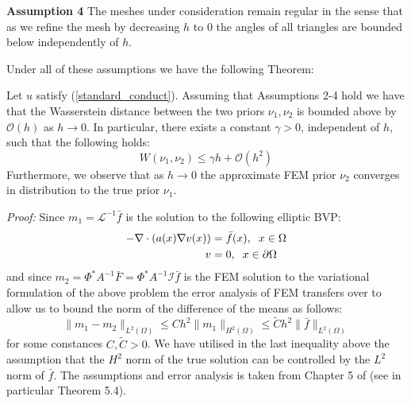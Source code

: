 \noindent \textbf{Assumption 4 } The meshes under consideration remain regular in the sense that as we refine the mesh by decreasing $h$ to 0 the angles of all triangles are bounded below independently of $h$.

Under all of these assumptions we have the following Theorem:
\vspace{10pt}

\begin{theorem}
    \label{prior_distance_bound}
    Let $u$ satisfy (\ref{standard_conduct}). Assuming that Assumptions 2-4 hold we have that the Wasserstein distance between the two priors $\nu_1,\nu_2$ is bounded above by $\mathcal{O}(h)$ as $h\rightarrow 0$. In particular, there exists a constant $\gamma>0$, independent of $h$, such that the following holds:
    \begin{equation}
        \label{bound_on_distance}
        W(\nu_{1},\nu_{2})\leq \gamma h +\mathcal{O}(h^2)
    \end{equation}
    Furthermore, we observe that as $h\rightarrow 0$ the approximate FEM prior $\nu_2$ converges in distribution to the true prior $\nu_1$.
\end{theorem}

\noindent \textit{Proof:} Since $m_1=\mathcal{L}^{-1}\bar{f}$ is the solution to the following elliptic BVP:
\begin{align*}
    -\nabla\cdot(a(x)\nabla v(x)) &= \bar{f}(x), \hspace{0.2cm} x\in\Omega \\
    v &= 0, \hspace{0.2cm} x\in\partial\Omega
\end{align*}
and since $m_2=\Phi^{*}A^{-1}\bar{F}=\Phi^{*}A^{-1}\mathcal{I}\bar{f}$ is the FEM solution to the variational formulation of the above problem the error analysis of FEM transfers over to allow us to bound the norm of the difference of the means as follows:
\begin{equation}
    \label{bound_on_diff_means}
    \|m_1-m_2\|_{L^{2}(\Omega)}\leq Ch^{2}\|m_{1}\|_{H^{2}(\Omega)}\leq\tilde{C}h^{2}\|\bar{f}\|_{L^{2}(\Omega)}
\end{equation}
for some constances $C,\tilde{C}>0$. We have utilised in the last inequality above the assumption that the $H^2$ norm of the true solution can be controlled by the $L^2$ norm of $\bar{f}$. The assumptions and error analysis is taken from Chapter 5 of \textcolor{blue}{\cite{larsson2008partial}} (see in particular Theorem 5.4).

